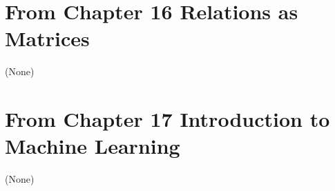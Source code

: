 \documentclass[letterpaper,10pt,english]{jupyterBook}
\begin{document}
\section{From Chapter 16 \sphinxhyphen{} Relations as Matrices}
\label{\detokenize{loyo-list:from-chapter-16-relations-as-matrices}}
\sphinxAtStartPar
(None)


\section{From Chapter 17 \sphinxhyphen{} Introduction to Machine Learning}
\label{\detokenize{loyo-list:from-chapter-17-introduction-to-machine-learning}}
\sphinxAtStartPar
(None)







\renewcommand{\indexname}{Index}
\printindex
\end{document}
